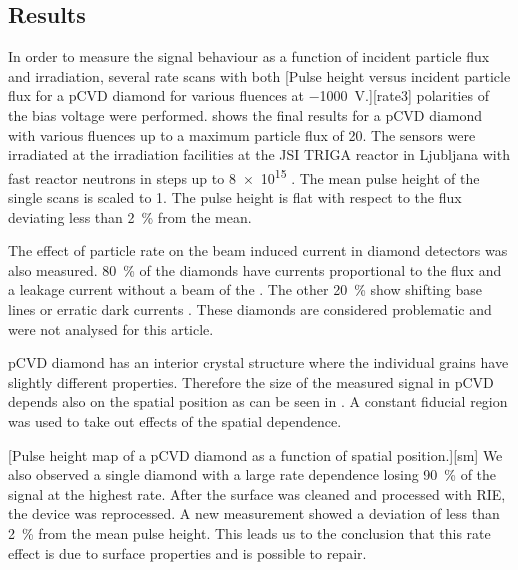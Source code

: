 \subsection{Results}
In order to measure the signal behaviour as a function of incident particle flux and irradiation, several rate scans with both 
[Pulse height versus incident particle flux for a \ac{pCVD} diamond for various fluences at \SI{-1000}{\volt}.][rate3]
polarities of the bias voltage were performed.  shows the final results for a \ac{pCVD} diamond with 
various fluences up to a maximum particle flux of \SI{20}{\mhzcm}. The sensors were irradiated at the irradiation facilities at the JSI TRIGA reactor in Ljubljana with fast reactor neutrons in steps up to \SI{8e15}{\ncm} \cite{irrad}. The mean pulse height of the single scans is scaled to 1. The pulse height is flat with respect to the flux deviating less than \SI{2}{\%} from the mean.\par 
The effect of particle rate on the beam induced current in diamond detectors was also measured. \SI{80}{\%} of the diamonds have currents proportional to the flux and a leakage current without a beam of the . The other \SI{20}{\%} show shifting base lines or erratic dark currents \cite{erratic}. These diamonds are considered problematic and were not analysed for this article.\par
\ac{pCVD} diamond has an interior crystal structure where the individual grains have slightly different properties. Therefore the size of the measured signal in \ac{pCVD} depends also on the spatial position as can be seen in . A constant fiducial region was used to take out effects of the spatial dependence. \par %
{}[Pulse height map of a \ac{pCVD} diamond as a function of spatial position.][sm]
We also observed a single diamond with a large rate dependence losing \SI{90}{\%} of the signal at the highest rate. After the surface was cleaned and processed with \ac{RIE}, the device was reprocessed. A new measurement showed a deviation of less than \SI{2}{\%} from the mean pulse height. This leads us to the conclusion that this rate effect is due to surface properties and is possible to repair.
